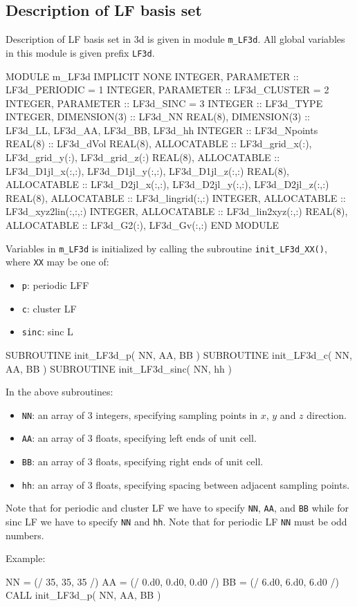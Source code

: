 \subsection{Description of LF basis set}

Description of LF basis set in 3d is given in module
{\tt m\_LF3d}. All global variables in this module is given
prefix {\tt LF3d}.

\begin{fortrancode}
MODULE m_LF3d
  IMPLICIT NONE
  INTEGER, PARAMETER :: LF3d_PERIODIC = 1
  INTEGER, PARAMETER :: LF3d_CLUSTER  = 2
  INTEGER, PARAMETER :: LF3d_SINC     = 3
  INTEGER :: LF3d_TYPE
  INTEGER, DIMENSION(3) :: LF3d_NN
  REAL(8), DIMENSION(3) :: LF3d_LL, LF3d_AA, LF3d_BB, LF3d_hh
  INTEGER :: LF3d_Npoints
  REAL(8) :: LF3d_dVol
  REAL(8), ALLOCATABLE :: LF3d_grid_x(:), LF3d_grid_y(:), LF3d_grid_z(:)
  REAL(8), ALLOCATABLE :: LF3d_D1jl_x(:,:), LF3d_D1jl_y(:,:), LF3d_D1jl_z(:,:)
  REAL(8), ALLOCATABLE :: LF3d_D2jl_x(:,:), LF3d_D2jl_y(:,:), LF3d_D2jl_z(:,:)
  REAL(8), ALLOCATABLE :: LF3d_lingrid(:,:)
  INTEGER, ALLOCATABLE :: LF3d_xyz2lin(:,:,:)
  INTEGER, ALLOCATABLE :: LF3d_lin2xyz(:,:)
  REAL(8), ALLOCATABLE :: LF3d_G2(:), LF3d_Gv(:,:)
END MODULE
\end{fortrancode}

Variables in {\tt m\_LF3d} is initialized by calling the subroutine
{\tt init\_LF3d\_XX()}, where {\tt XX} may be one of:
\begin{itemize}
\item {\tt p}: periodic LFF
\item {\tt c}: cluster LF
\item {\tt sinc}: sinc L
\end{itemize}

\begin{fortrancode}
SUBROUTINE init_LF3d_p( NN, AA, BB )
SUBROUTINE init_LF3d_c( NN, AA, BB )
SUBROUTINE init_LF3d_sinc( NN, hh )
\end{fortrancode}

In the above subroutines:
\begin{itemize}
\item {\tt NN}: an array of 3 integers, specifying sampling points in $x$,
$y$ and $z$ direction.
\item {\tt AA}: an array of 3 floats, specifying left ends of unit cell.
\item {\tt BB}: an array of 3 floats, specifying right ends of unit cell.
\item {\tt hh}: an array of 3 floats, specifying spacing between adjacent sampling points.
\end{itemize}

Note that for periodic and cluster LF we have to specify {\tt NN}, {\tt AA}, and {\tt BB}
while for sinc LF we have to specify {\tt NN} and {\tt hh}.
Note that for periodic LF {\tt NN} must be odd numbers.

Example:
\begin{fortrancode}
NN = (/ 35, 35, 35 /)
AA = (/ 0.d0, 0.d0, 0.d0 /)
BB = (/ 6.d0, 6.d0, 6.d0 /)
CALL init_LF3d_p( NN, AA, BB )
\end{fortrancode}
